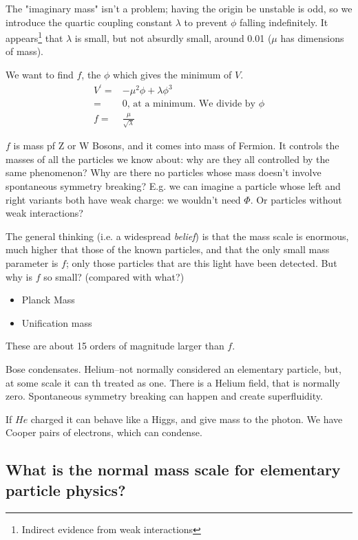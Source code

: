 \documentclass[]{article}
\begin{document}
The "imaginary mass" isn't a problem; having the origin be unstable is odd, so we introduce the quartic coupling constant $\lambda$ to prevent $\phi$ falling indefinitely. It appears\footnote{Indirect evidence from weak interactions} that $\lambda$ is small, but not absurdly small, around 0.01 ($\mu$ has dimensions of mass).

We want to find $f$, the $\phi$ which gives the minimum of $V$.
\begin{align*}
	V^\prime =& -\mu^2 \phi + \lambda \phi^3\\
	=& 0 \text{, at a minimum. We divide by $\phi$}\\
	f =& \frac{\mu}{\sqrt{\lambda}}
\end{align*}

$f$ is mass pf Z or W Bosons, and it comes into mass of Fermion. It controls the masses of all the particles we know about: why are they all controlled by the same phenomenon? Why are there no particles whose mass doesn't involve spontaneous symmetry breaking? E.g. we can imagine a particle whose left and right variants both have weak charge: we wouldn't need $\Phi$. Or particles without weak interactions?

The general thinking (i.e. a widespread \emph{belief}) is that the mass scale is enormous, much higher that those of the known particles, and that the only small mass parameter is $f$; only those particles that are this light have been detected. But why is $f$ so small? (compared with what?) 

\begin{itemize}
	\item Planck Mass
	\item Unification mass
\end{itemize}

These are about 15 orders of magnitude larger than $f$.

Bose condensates. Helium--not normally considered an elementary particle, but, at some scale it can th treated as one. There is a Helium field, that is normally zero. Spontaneous symmetry breaking can happen and create superfluidity.

If $He$ charged it can behave like a Higgs, and give mass to the photon. We have Cooper pairs of electrons, which can condense.

\subsection{What is the normal mass scale for elementary particle physics?}
\end{document}
